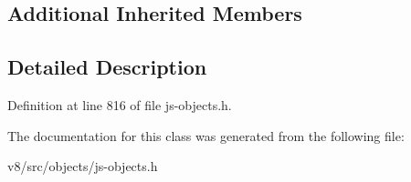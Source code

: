 \subsection*{Additional Inherited Members}


\subsection{Detailed Description}


Definition at line 816 of file js-\/objects.\+h.



The documentation for this class was generated from the following file\+:\begin{DoxyCompactItemize}
\item 
v8/src/objects/js-\/objects.\+h\end{DoxyCompactItemize}
